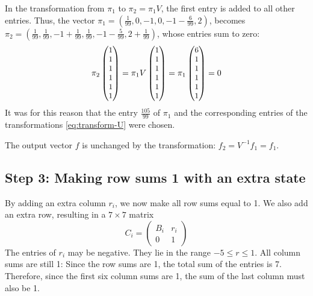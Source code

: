 \documentclass[a4paper,cleveref, autoref, thm-restate]{lipics-v2021}
\begin{document}
In the transformation from $\pi_1$ to
$\pi_2 = \pi_1 V$, the first entry is added to all other entries.
Thus, the vector
$\pi_1=(\frac{1}{99}
,
0,-1,0,-1-\frac{6}{99},2)$, 
becomes 
$\pi_2=(\frac{1}{99},\frac{1}{99},-1+\frac{1}{99},\frac{1}{99},-1-\frac{5}{99},2+\frac{1}{99})$,
whose entries sum to zero:
\begin{equation}
  \label{eq:pi-sum-zero}
  \pi_2\left(\small %
  \begin{matrix}
    1\\1\\1\\1\\1\\1
  \end{matrix}\right)
=
  \pi_1V\left(\small
  \begin{matrix}
    1\\1\\1\\1\\1\\1
  \end{matrix}\right)
=
  \pi_1\left(\small
  \begin{matrix}
    6\\1\\1\\1\\1\\1
  \end{matrix}\right)
= 0
\end{equation}
It was for this reason that the entry
 $\frac{105}{99}$ of $\pi_1$ and the corresponding entries of
 the transformations \eqref{eq:transform-U} were chosen.
 
The output vector $f$ is unchanged by the transformation:
$f_2 =  V^{-1}f_1=f_1$.

\subsection{Step 3: Making row sums 1 with
  an extra state}
\label{sec:row-1}
\label{sec:step3}
By adding an extra column $r_i$, we now make all row sums equal to 1.
We also add an extra row, resulting in a $7\times7$ matrix
\begin{equation}
  C_i =
  \begin{pmatrix}
    B_i & r_i\\
    0 & 1
  \end{pmatrix}
\end{equation}
The entries of $r_i$ may be negative. They lie in the range
$-5\le r \le 1$.
All column sums are still 1: Since the row sums are 1, the total sum
of the entries is 7. Therefore, since the first six column sums are 1, the sum of
the last column must also be 1.
\end{document}
